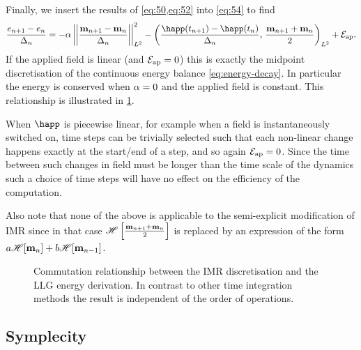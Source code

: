 Finally, we insert the results of \cref{eq:50,eq:52} into \cref{eq:54} to find
\begin{equation}
  \frac{\e_{n+1} - \e_n}{\dtn}
  = -\dampc \ltnorm{\mpdmdt}^2
  - \ltip{\frac{\happ(t_{n+1}) -\happ(t_n)}{\dtn}}{\frac{\mv_{n+1} + \mv_{n}}{2}}
  + \happerror.
  \label{eqn:imr-llg-energy}
\end{equation}
If the applied field is linear (and $\mathcal{E}_\text{ap} = 0$) this is exactly the midpoint discretisation of the continuous energy balance \cref{eq:energy-decay}.
In particular the energy is conserved when $\alpha = 0$ and the applied field is constant.
This relationship is illustrated in \cref{fig:commutation-imr-energy}.

When $\happ$ is piecewise linear, for example when a field is instantaneously switched on, time steps can be trivially selected such that each non-linear change happens exactly at the start/end of a step, and so again $\mathcal{E}_\text{ap} = 0$.
Since the time between such changes in field must be longer than the time scale of the dynamics such a choice of time steps will have no effect on the efficiency of the computation.

Also note that none of the above is applicable to the semi-explicit modification of IMR since in that case $\mathscr{H} \left[ \frac{\mathbf{m}_{n+1} + \mathbf{m}_n}{2} \right]$ is replaced by an expression of the form $a\mathscr{H} {\left[ \mathbf{m}_n \right]} + b\mathscr{H} {\left[ \mathbf{m}_{n-1} \right]}$.

\begin{figure}
  \centering
  \caption{Commutation relationship between the IMR discretisation and the LLG energy derivation. 
In contrast to other time integration methods the result is independent of the order of operations.}
\label{fig:commutation-imr-energy}
\end{figure}


\subsection{Symplecity}

